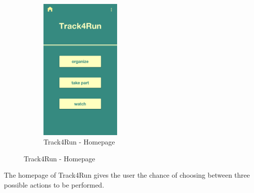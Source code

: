 \begin{figure}[H]
\begin{subfigure}{.33\textwidth}
  \centering
  \includegraphics[width = .9\linewidth, height = 7cm, keepaspectratio]{./Images/Mockups/Track4Run/T4R_Homepage.png}
  \caption{Track4Run - Homepage}
\end{subfigure}
\end{figure}
  The homepage of Track4Run gives the user the chance of choosing between three possible actions to be performed.



